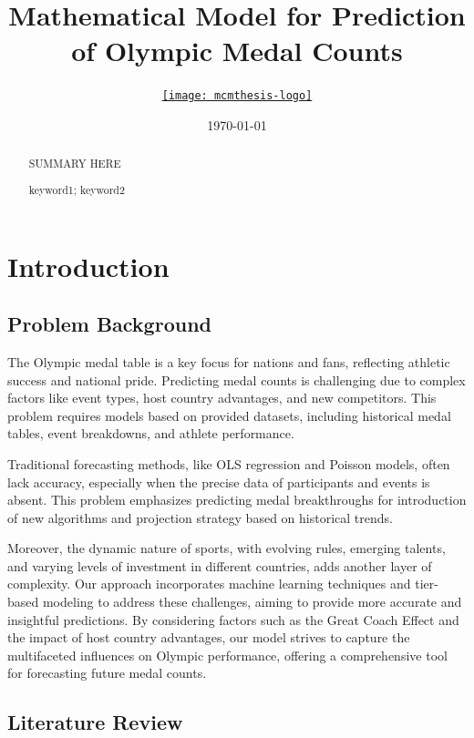 \documentclass{mcmthesis}
\title{Mathematical Model for Prediction of Olympic Medal Counts}
\author{\small \href{https://www.latexstudio.net/}
  {\texttt{[image: mcmthesis-logo]}}}
\date{\today}
\begin{document}
\begin{abstract}
    \par 
        SUMMARY HERE

\begin{keywords}
    keyword1; keyword2
\end{keywords}

\end{abstract}
\maketitle
\tableofcontents
\newpage

\section{Introduction}
\subsection{Problem Background}
The Olympic medal table is a key focus for nations and fans, reflecting athletic success and national pride. Predicting medal counts is challenging due to complex factors like event types, host country advantages, and new competitors. This problem requires models based on provided datasets, including historical medal tables, event breakdowns, and athlete performance.

Traditional forecasting methods, like OLS regression and Poisson models, often lack accuracy, especially when the precise data of participants and events is absent. This problem emphasizes predicting medal breakthroughs for introduction of new algorithms and projection strategy based on historical trends.

Moreover, the dynamic nature of sports, with evolving rules, emerging talents, and varying levels of investment in different countries, adds another layer of complexity. Our approach incorporates machine learning techniques and tier-based modeling to address these challenges, aiming to provide more accurate and insightful predictions. By considering factors such as the Great Coach Effect and the impact of host country advantages, our model strives to capture the multifaceted influences on Olympic performance, offering a comprehensive tool for forecasting future medal counts.

\subsection{Literature Review}
\end{document}
